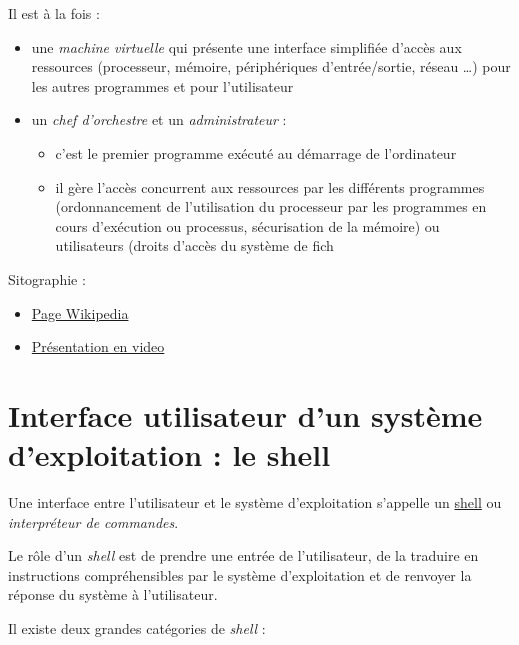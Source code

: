 \documentclass[
  11pt,
]{article}
\providecommand{\tightlist}{%
  \setlength{\itemsep}{0pt}\setlength{\parskip}{0pt}}
\newcounter{cours}
\newcounter{prog}
\begin{document}
Il est à la fois :

\begin{itemize}
\item
  une \emph{machine virtuelle} qui présente une interface simplifiée
  d'accès aux ressources (processeur, mémoire, périphériques
  d'entrée/sortie, réseau \ldots) pour les autres programmes et pour
  l'utilisateur
\item
  un \emph{chef d'orchestre} et un \emph{administrateur} :

  \begin{itemize}
  \tightlist
  \item
    c'est le premier programme exécuté au démarrage de l'ordinateur
  \item
    il gère l'accès concurrent aux ressources par les différents
    programmes (ordonnancement de l'utilisation du processeur par les
    programmes en cours d'exécution ou processus, sécurisation de la
    mémoire) ou utilisateurs (droits d'accès du système de fich
  \end{itemize}
\end{itemize}

Sitographie :

\begin{itemize}
\tightlist
\item
  \href{https://fr.wikipedia.org/wiki/Syst\%C3\%A8me_d\%27exploitation}{Page
  Wikipedia}
\item
  \href{https://www.lumni.fr/video/comprendre-ce-qu-est-un-systeme-d-exploitation}{Présentation
  en video}
\end{itemize}

\hypertarget{interface-utilisateur-dun-systuxe8me-dexploitation-le-shell}{%
\section{Interface utilisateur d'un système d'exploitation : le
shell}\label{interface-utilisateur-dun-systuxe8me-dexploitation-le-shell}}

Une interface entre l'utilisateur et le système d'exploitation s'appelle
un \href{https://fr.wikipedia.org/wiki/Shell_Unix}{shell} ou
\emph{interpréteur de commandes}.

Le rôle d'un \emph{shell} est de prendre une entrée de l'utilisateur, de
la traduire en instructions compréhensibles par le système
d'exploitation et de renvoyer la réponse du système à l'utilisateur.

Il existe deux grandes catégories de \emph{shell} :
\end{document}

